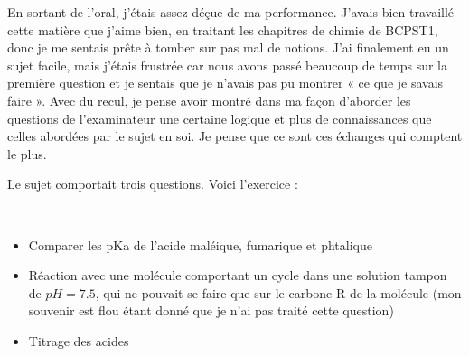 \lettrine{{\color{yellow!80!black} \oldpilcrowfive}}{}
En sortant de l’oral, j’étais assez déçue de ma performance. J’avais bien travaillé cette matière que j’aime bien, en traitant les chapitres de chimie de BCPST1, donc je me sentais prête à tomber sur pas mal de notions. J’ai finalement eu un sujet facile, mais j’étais frustrée car nous avons passé beaucoup de temps sur la première question et je sentais que je n’avais pas pu montrer « ce que je savais faire ». Avec du recul, je pense avoir montré dans ma façon d’aborder les questions de l’examinateur une certaine logique et plus de connaissances que celles abordées par le sujet en soi. Je pense que ce sont ces échanges qui comptent le plus.

Le sujet comportait trois questions. Voici l'exercice :
\newpage
\hrulefill

\hspace{-.25cm}\begin{minipage}{\linewidth}
\end{minipage}\\

\begin{itemize}
    \item Comparer les pKa de l’acide maléique, fumarique et phtalique 
    \item Réaction avec une molécule comportant un cycle dans une solution tampon de $pH = 7.5$, qui ne pouvait se faire que sur le carbone R de la molécule (mon souvenir est flou étant donné que je n’ai pas traité cette question)
    \item Titrage des acides
\end{itemize}

